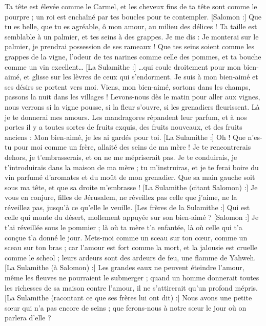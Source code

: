 \begin{multicols}{2}
Ta tête est élevée comme le Carmel, et les cheveux fins de ta tête sont comme le pourpre ; un roi est enchaîné par tes boucles pour te contempler.
[Salomon :] Que tu es belle, que tu es agréable, ô mon amour, au milieu des délices !
Ta taille est semblable à un palmier, et tes seins à des grappes.
Je me dis : Je monterai sur le palmier, je prendrai possession de ses rameaux ! Que tes seins soient comme les grappes de la vigne, l’odeur de tes narines comme celle des pommes,
et ta bouche comme un vin excellent… [La Sulamithe :] …qui coule droitement pour mon bien-aimé, et glisse sur les lèvres de ceux qui s’endorment.
Je suis à mon bien-aimé et ses désirs se portent vers moi.
Viens, mon bien-aimé, sortons dans les champs, passons la nuit dans les villages !
Levons-nous dès le matin pour aller aux vignes, nous verrons si la vigne pousse, si la fleur s’ouvre, si les grenadiers fleurissent. Là je te donnerai mes amours.
Les mandragores répandent leur parfum, et à nos portes il y a toutes sortes de fruits exquis, des fruits nouveaux, et des fruits anciens : Mon bien-aimé, je les ai gardés pour toi.
\VerseOne{}[La Sulamithe :] Oh ! Que n’es-tu pour moi comme un frère, allaité des seins de ma mère ! Je te rencontrerais dehors, je t’embrasserais, et on ne me mépriserait pas.
Je te conduirais, je t’introduirais dans la maison de ma mère ; tu m’instruiras, et je te ferai boire du vin parfumé d'aromates et du moût de mon grenadier.
Que sa main gauche soit sous ma tête, et que sa droite m'embrasse !
[La Sulamithe (citant Salomon) :] Je vous en conjure, filles de Jérusalem, ne réveillez pas celle que j'aime, ne la réveillez pas, jusqu'à ce qu'elle le veuille.
[Les frères de la Sulamithe :] Qui est celle qui monte du désert, mollement appuyée sur son bien-aimé ? [Salomon :] Je t'ai réveillée sous le pommier ; là où ta mère t'a enfantée, là où celle qui t'a conçue t'a donné le jour.
Mets-moi comme un sceau sur ton cœur, comme un sceau sur ton bras ; car l'amour est fort comme la mort, et la jalousie est cruelle comme le scheol ; leurs ardeurs sont des ardeurs de feu, une flamme de Yahweh.
[La Sulamithe (à Salomon) :] Les grandes eaux ne peuvent éteindre l’amour, même les fleuves ne pourraient le submerger ; quand un homme donnerait toutes les richesses de sa maison contre l’amour, il ne s’attirerait qu’un profond mépris.
[La Sulamithe (racontant ce que ses frères lui ont dit) :] Nous avons une petite sœur qui n'a pas encore de seins ; que ferons-nous à notre sœur le jour où on parlera d’elle ?

\end{multicols}
